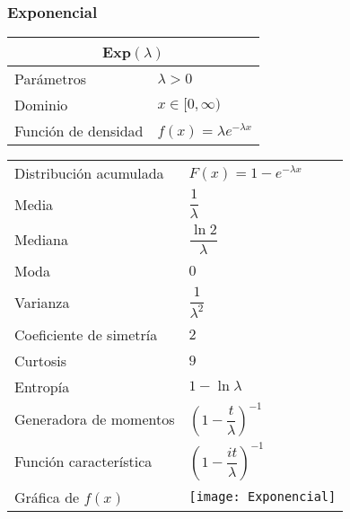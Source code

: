 \documentclass[12pt,a4paper]{article}
\begin{document}
\subsubsection*{Exponencial}
\begin{center}
	\begin{tabular}{p{}|p{}}
	\multicolumn{2}{c}{Exp$(\lambda)$} \\
	\hline
	Parámetros & $\lambda > 0$ \\
	Dominio & $x\in [0,\infty )$ \\
	Función de densidad & $f(x) = \lambda e^{-\lambda x}$
	\end{tabular}
	\begin{tabular}{p{}|p{}}
	Distribución acumulada & $F(x) = 1 - e^{-\lambda x}$ \\
	Media & $\dfrac{1}{\lambda}$ \\
	Mediana & $\dfrac{\ln 2}{\lambda}$ \\
	Moda & $0$ \\
	Varianza & $\dfrac{1}{\lambda^2}$ \\
	Coeficiente de simetría & $2$ \\
	Curtosis & $9$ \\
	Entropía & $1 - \ln\lambda$ \\
	Generadora de momentos & $\left( 1 - \dfrac{t}{\lambda} \right)^{-1}$ \\
	Función característica & $\left( 1 - \dfrac{it}{\lambda} \right)^{-1}$ \\
	\vspace{0.25cm}Gráfica de $f(x)$ & \vspace{0.1mm}\texttt{[image: Exponencial]}
	\end{tabular}
\end{center}
\end{document}
